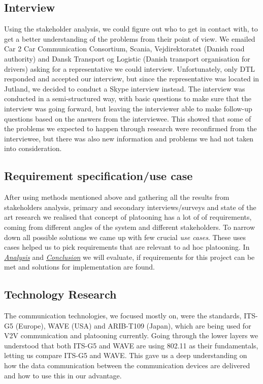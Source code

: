 \subsection{Interview}
Using the stakeholder analysis, we could figure out who to get in contact with, to get a better understanding of the problems from their point of view. We emailed Car 2 Car Communication Consortium, Scania, Vejdirektoratet (Danish road authority) and Dansk Transport og Logistic (Danish transport organisation for drivers) asking for a representative we could interview.
Unfortunately, only DTL responded and accepted our interview, but since the representative was located in Jutland, we decided to conduct a Skype interview instead. The interview was conducted in a semi-structured way, with basic questions to make sure that the interview was going forward, but leaving the interviewer able to make follow-up questions based on the answers from the interviewee. This showed that some of the problems we expected to happen through research were reconfirmed from the interviewee, but there was also new information and problems we had not taken into consideration.
% 
\subsection{Requirement specification/use case}
After using methods mentioned above and gathering all the results from stakeholders analysis, primary and secondary interviews/surveys and state of the art research we realised that concept of platooning has a lot of of requirements, coming from different angles of the system and different stakeholders. To narrow down all possible solutions we came up with few crucial \emph{use cases}. These uses cases helped us to pick requirements that are relevant to ad hoc platooning. In \hyperref[sec:analysis]{\textit{Analysis}} and \hyperref[sec:conclusion]{\textit{Conclusion}} we will evaluate, if requirements for this project can be met and solutions for implementation are found.
% 
\subsection{Technology Research}
The communication technologies, we focused mostly on, were the standards, ITS-G5 (Europe), WAVE (USA) and ARIB-T109 (Japan), which are being used for V2V communication and platooning currently. Going through the lower layers we understood that both ITS-G5 and WAVE are using 802.11 as their fundamentals, letting us compare ITS-G5 and WAVE. This gave us a deep understanding on how the data communication between the communication devices are delivered and how to use this in our advantage.

